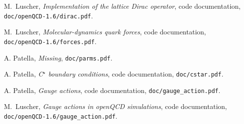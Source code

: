 \documentclass[11pt,fleqn]{article}
\begin{document}
\begin{thebibliography}{9}

  M.~Luscher,
  \textit{Implementation of the lattice Dirac operator}, code documentation,
  \texttt{doc/openQCD-1.6/dirac.pdf}.

  M.~Luscher,
  \textit{Molecular-dynamics quark forces}, code documentation,
  \texttt{doc/openQCD-1.6/forces.pdf}.

  A. Patella,
  \textit{Missing},
  \texttt{doc/parms.pdf}.

  A. Patella,
  \textit{C$^\star$ boundary conditions}, code documentation,
  \texttt{doc/cstar.pdf}.

  A. Patella,
  \textit{Gauge actions}, code documentation,
  \texttt{doc/gauge\_action.pdf}.

  M.~Luscher,
  \textit{Gauge actions in openQCD simulations}, code documentation,
  \texttt{doc/openQCD-1.6/gauge\_action.pdf}.


\end{thebibliography}
\end{document}
